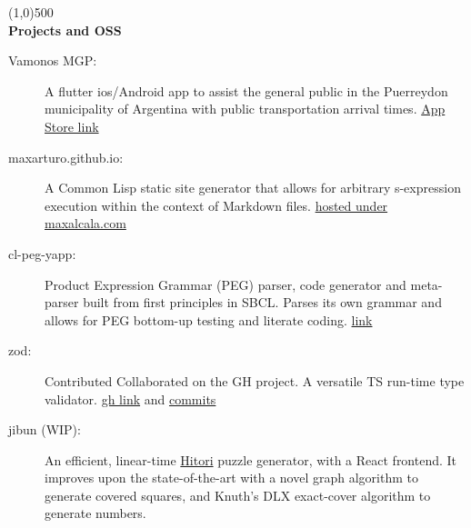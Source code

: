 \documentclass[letterpaper,11pt]{article}
\newcommand{\resheading}[1]{{\large {\textbf{#1 \vphantom{p\^{E}}}}}}
\newcommand{\addline}{\line(1,0){500}}
\begin{document}
\addline
\\
\resheading{Projects and OSS}
\begin{description}
  \item [Vamonos MGP:] A flutter ios/Android app to assist the general public in the Puerreydon municipality of Argentina with public transportation arrival times. \href{https://apps.apple.com/us/app/vamonos-mgp/id6447891853}{App Store link}

	\item [maxarturo.github.io:] A Common Lisp static site generator that allows for arbitrary s-expression execution within the context of Markdown files. \href{https://github.com/maxArturo/maxarturo.github.io}{hosted under maxalcala.com}
	
  \item [cl-peg-yapp:] Product Expression Grammar (PEG) parser, code generator and meta-parser built from first principles in SBCL. Parses its own grammar and allows for PEG bottom-up testing and literate coding. \href{https://github.com/maxArturo/cl-peg-yapp}{link}

  \item [zod:] Contributed Collaborated on the GH project. A versatile TS run-time type validator. \href{https://github.com/colinhacks/zod}{gh link} and \href{https://github.com/colinhacks/zod/commits?author=maxArturo}{commits}

	\item [jibun (WIP):] An efficient, linear-time \href{https://en.wikipedia.org/wiki/Hitori}{Hitori} puzzle generator, with a React frontend. It improves upon the state-of-the-art with a novel graph algorithm to generate covered squares, and Knuth's DLX exact-cover algorithm to generate numbers.

\end{description}
\end{document}
